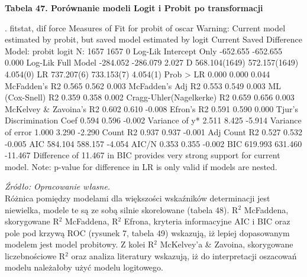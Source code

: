 \vspace{0.5cm}
\textbf{Tabela 47. Porównanie modeli Logit i Probit po transformacji}
\begin{stlog}
. fitstat, dif force
{\smallskip}
Measures of Fit for probit of oscar
{\smallskip}
Warning: Current model estimated by probit, but saved model estimated by logit
{\smallskip}
                               Current             Saved        Difference
Model:                          probit             logit
N:                                1657              1657                 0
Log-Lik Intercept Only        -652.655          -652.655             0.000
Log-Lik Full Model            -284.052          -286.079             2.027
D                              568.104(1649)     572.157(1649)       4.054(0)
LR                             737.207(6)        733.153(7)          4.054(1)
Prob > LR                        0.000             0.000             0.044
McFadden's R2                    0.565             0.562             0.003
McFadden's Adj R2                0.553             0.549             0.003
ML (Cox-Snell) R2                0.359             0.358             0.002
Cragg-Uhler(Nagelkerke) R2       0.659             0.656             0.003
McKelvey \& Zavoina's R2          0.602             0.610            -0.008
Efron's R2                       0.591             0.590             0.000
Tjur's Discrimination Coef       0.594             0.596            -0.002
Variance of y*                   2.511             8.425            -5.914
Variance of error                1.000             3.290            -2.290
Count R2                         0.937             0.937            -0.001
Adj Count R2                     0.527             0.532            -0.005
AIC                            584.104           588.157            -4.054
AIC/N                            0.353             0.355            -0.002
BIC                            619.993           631.460           -11.467
{\smallskip}
Difference of   11.467 in BIC provides very strong support for current model.
{\smallskip}
Note: p-value for difference in LR is only valid if models are nested.
\end{stlog}
\textit{\footnotesize{Źródło: Opracowanie własne.}} \\

Różnica pomiędzy modelami dla większości wskaźników determinacji jest niewielka, modele te są ze sobą silnie skorelowane (tabela 48). R$^2$ McFaddena, skorygowane R$^2$ McFaddena,  R$^2$ Efrona, kryteria informacyjne AIC i BIC oraz pole pod krzywą ROC (rysunek 7, tabela 49) wskazują, iż lepiej dopasowanym modelem jest model probitowy. Z kolei R$^2$ McKelvey'a \& Zavoina, skorygowane liczebnościowe R$^2$ oraz analiza literatury wskazują, iż do interpretacji oszacowań modelu należałoby użyć modelu logitowego. 

